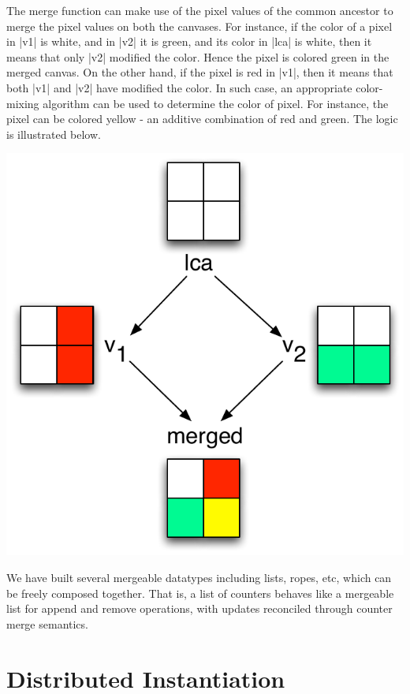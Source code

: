 \documentclass[twocolumn,9pt]{extarticle}
\begin{document}
The merge function can make use of the pixel values of the common ancestor to
merge the pixel values on both the canvases. For instance, if the color of a
pixel in |v1| is white, and in |v2| it is green, and its color in |lca|
is white, then it means that only |v2| modified the color. Hence the pixel is
colored green in the merged canvas. On the other hand, if the pixel is red in
|v1|, then it means that both |v1| and |v2| have modified the color. In
such case, an appropriate color-mixing algorithm can be used to determine the
color of pixel.  For instance, the pixel can be colored yellow - an additive
combination of red and green. The logic is illustrated below.

\begin{center}
\includegraphics[scale=0.4]{Figures/canvas-merging}
\end{center}

We have built several mergeable datatypes including lists, ropes, etc, which
can be freely composed together. That is, a list of counters behaves like a
mergeable list for append and remove operations, with updates reconciled
through counter merge semantics.

\section{Distributed Instantiation}
\end{document}
